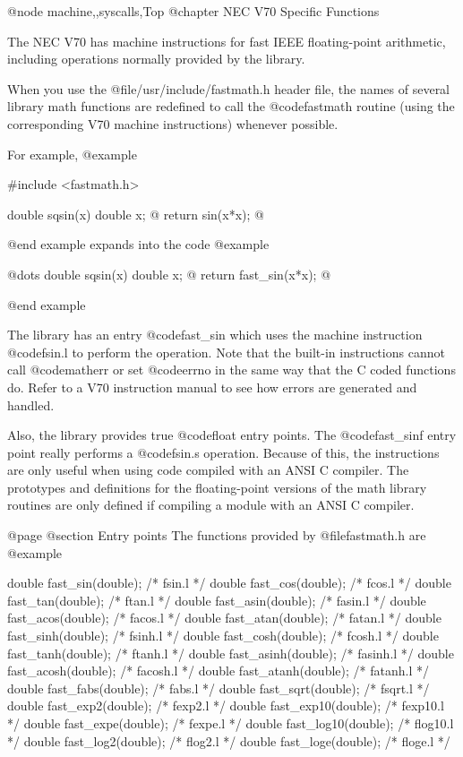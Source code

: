 @node machine,,syscalls,Top
@chapter NEC V70 Specific Functions

The NEC V70 has machine instructions for fast IEEE floating-point
arithmetic, including operations normally provided by the library.

When you use the @file{/usr/include/fastmath.h} header file, the
names of several library math functions are redefined to call the
@code{fastmath} routine (using the corresponding V70 machine instructions)
whenever possible.

For example,
@example

#include <fastmath.h>

double sqsin(x)
double x;
@{
  return sin(x*x);
@}

@end example
expands into the code
@example

@dots{}
double sqsin(x)
double x;
@{
  return fast_sin(x*x);
@}

@end example

The library has an entry @code{fast_sin} which uses the machine
instruction @code{fsin.l} to perform the operation.  Note that the
built-in instructions cannot call @code{matherr} or set @code{errno}
in the same way that the C coded functions do.  Refer to a V70
instruction manual to see how errors are generated and handled.

Also, the library provides true @code{float} entry points.  The
@code{fast_sinf} entry point really performs a @code{fsin.s}
operation.  Because of this, the instructions are only useful when
using code compiled with an ANSI C compiler.  The prototypes
and definitions for the floating-point versions of the math library
routines are only defined if compiling a module with an ANSI C
compiler.

@page
@section Entry points
The functions provided by @file{fastmath.h} are
@example

 double fast_sin(double);	/*	fsin.l */
 double fast_cos(double);	/*	fcos.l */
 double fast_tan(double);	/*	ftan.l */
 double fast_asin(double);	/*	fasin.l */
 double fast_acos(double);	/*	facos.l */
 double fast_atan(double);	/*	fatan.l */
 double fast_sinh(double);	/*	fsinh.l */
 double fast_cosh(double);	/*	fcosh.l */
 double fast_tanh(double);	/*	ftanh.l */
 double fast_asinh(double);	/*	fasinh.l */
 double fast_acosh(double);	/*	facosh.l */
 double fast_atanh(double);	/*	fatanh.l */
 double fast_fabs(double);	/*	fabs.l */
 double fast_sqrt(double);	/*	fsqrt.l */
 double fast_exp2(double);	/*	fexp2.l */
 double fast_exp10(double);	/*	fexp10.l */
 double fast_expe(double);	/*	fexpe.l */
 double fast_log10(double);	/*	flog10.l */
 double fast_log2(double);	/*	flog2.l */
 double fast_loge(double);	/*	floge.l */

